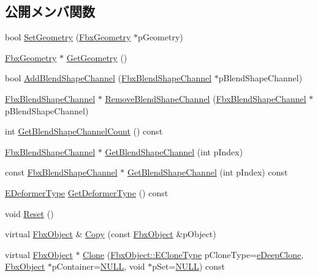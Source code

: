 \subsection*{公開メンバ関数}
\begin{DoxyCompactItemize}
\item 
bool \hyperlink{class_fbx_blend_shape_aafaf4d30fd6dca540ad6f0f0b1062def}{Set\+Geometry} (\hyperlink{class_fbx_geometry}{Fbx\+Geometry} $\ast$p\+Geometry)
\item 
\hyperlink{class_fbx_geometry}{Fbx\+Geometry} $\ast$ \hyperlink{class_fbx_blend_shape_a2cea3099fb3f8ba5616d1b794371909e}{Get\+Geometry} ()
\item 
bool \hyperlink{class_fbx_blend_shape_a0513dbd59321be93fd18f3aeae79b49a}{Add\+Blend\+Shape\+Channel} (\hyperlink{class_fbx_blend_shape_channel}{Fbx\+Blend\+Shape\+Channel} $\ast$p\+Blend\+Shape\+Channel)
\item 
\hyperlink{class_fbx_blend_shape_channel}{Fbx\+Blend\+Shape\+Channel} $\ast$ \hyperlink{class_fbx_blend_shape_ae68aaed993da38c536a35a698c5d435a}{Remove\+Blend\+Shape\+Channel} (\hyperlink{class_fbx_blend_shape_channel}{Fbx\+Blend\+Shape\+Channel} $\ast$p\+Blend\+Shape\+Channel)
\item 
int \hyperlink{class_fbx_blend_shape_aed732607e7af47260646f394897a6855}{Get\+Blend\+Shape\+Channel\+Count} () const
\item 
\hyperlink{class_fbx_blend_shape_channel}{Fbx\+Blend\+Shape\+Channel} $\ast$ \hyperlink{class_fbx_blend_shape_aac445f8468f3135f5c810ef51a089ff2}{Get\+Blend\+Shape\+Channel} (int p\+Index)
\item 
const \hyperlink{class_fbx_blend_shape_channel}{Fbx\+Blend\+Shape\+Channel} $\ast$ \hyperlink{class_fbx_blend_shape_a2f945fdf198655b0434e5bde7d897a8a}{Get\+Blend\+Shape\+Channel} (int p\+Index) const
\item 
\hyperlink{class_fbx_deformer_a07e2cfb767191ba5c8799fdfbfe3eaf6}{E\+Deformer\+Type} \hyperlink{class_fbx_blend_shape_afc886286ac95264b993335d8b3954b4f}{Get\+Deformer\+Type} () const
\item 
void \hyperlink{class_fbx_blend_shape_ac7076c304c81d96b729188a8f942d84d}{Reset} ()
\item 
virtual \hyperlink{class_fbx_object}{Fbx\+Object} \& \hyperlink{class_fbx_blend_shape_aeecdd8e01145a974bcb53a65cfc913f2}{Copy} (const \hyperlink{class_fbx_object}{Fbx\+Object} \&p\+Object)
\item 
virtual \hyperlink{class_fbx_object}{Fbx\+Object} $\ast$ \hyperlink{class_fbx_blend_shape_aea5560eb695574977b5e7b8d0387d81a}{Clone} (\hyperlink{class_fbx_object_a9f5626b2d2135684d6ea1e6e4ad2acbb}{Fbx\+Object\+::\+E\+Clone\+Type} p\+Clone\+Type=\hyperlink{class_fbx_object_a9f5626b2d2135684d6ea1e6e4ad2acbbaacdf137ca059c572798287e98c4236d0}{e\+Deep\+Clone}, \hyperlink{class_fbx_object}{Fbx\+Object} $\ast$p\+Container=\hyperlink{fbxarch_8h_a070d2ce7b6bb7e5c05602aa8c308d0c4}{N\+U\+LL}, void $\ast$p\+Set=\hyperlink{fbxarch_8h_a070d2ce7b6bb7e5c05602aa8c308d0c4}{N\+U\+LL}) const
\end{DoxyCompactItemize}

